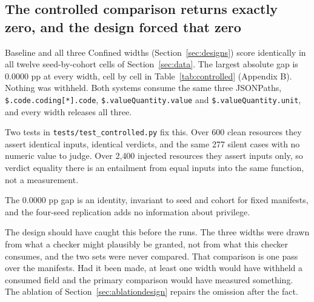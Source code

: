 \subsection{The controlled comparison returns exactly zero, and the design forced that zero}
\label{sec:controlled}
\label{sec:identity}

Baseline and all three Confined widths (Section~\ref{sec:designs}) score identically in all twelve
seed-by-cohort cells of Section~\ref{sec:data}. The largest absolute gap is $0.0000$ pp at every
width, cell by cell in Table~\ref{tab:controlled} (Appendix B). Nothing was withheld. Both systems
consume the same three JSONPaths, \texttt{\$.code.coding[*].\allowbreak code},
\texttt{\$.valueQuantity.\allowbreak value} and \texttt{\$.valueQuantity.\allowbreak unit}, and
every width releases all three.

Two tests in \texttt{tests/test\_controlled.py} fix this. Over 600 clean resources they assert
identical inputs, identical verdicts, and the same 277 silent cases with no numeric value to judge.
Over 2{,}400 injected resources they assert inputs only, so verdict equality there is an entailment
from equal inputs into the same function, not a measurement.

The $0.0000$ pp gap is an identity, invariant to seed and cohort for fixed manifests, and the
four-seed replication adds no information about privilege.

The design should have caught this before the runs. The three widths were drawn from what a checker
might plausibly be granted, not from what this checker consumes, and the two sets were never
compared. That comparison is one pass over the manifests. Had it been made, at least one width would
have withheld a consumed field and the primary comparison would have measured something. The
ablation of Section~\ref{sec:ablationdesign} repairs the omission after the fact.
